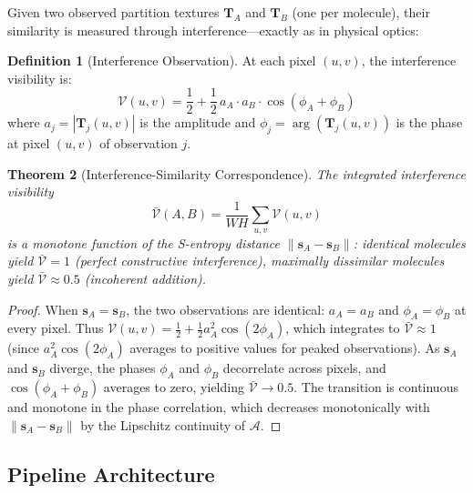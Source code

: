 \documentclass[11pt,twocolumn,a4paper]{article}
\newtheorem{theorem}{Theorem}[section]
\theoremstyle{definition}
\newtheorem{definition}[theorem]{Definition}
\theoremstyle{remark}
\begin{document}
Given two observed partition textures $\mathbf{T}_A$ and $\mathbf{T}_B$ (one per molecule), their similarity is measured through interference---exactly as in physical optics:

\begin{definition}[Interference Observation]
\label{def:interference}
At each pixel $(u,v)$, the interference visibility is:
\begin{equation}
\mathcal{V}(u,v) = \frac{1}{2} + \frac{1}{2}\, a_A \cdot a_B \cdot \cos(\phi_A + \phi_B)
\label{eq:visibility}
\end{equation}
where $a_j = |\mathbf{T}_j(u,v)|$ is the amplitude and $\phi_j = \arg(\mathbf{T}_j(u,v))$ is the phase at pixel $(u,v)$ of observation $j$.
\end{definition}

\begin{theorem}[Interference-Similarity Correspondence]
\label{thm:interference_similarity}
The integrated interference visibility
\begin{equation}
\bar{\mathcal{V}}(A, B) = \frac{1}{WH} \sum_{u,v} \mathcal{V}(u,v)
\label{eq:integrated_visibility}
\end{equation}
is a monotone function of the S-entropy distance $\|\mathbf{s}_A - \mathbf{s}_B\|$: identical molecules yield $\bar{\mathcal{V}} = 1$ (perfect constructive interference), maximally dissimilar molecules yield $\bar{\mathcal{V}} \approx 0.5$ (incoherent addition).
\end{theorem}

\begin{proof}
When $\mathbf{s}_A = \mathbf{s}_B$, the two observations are identical: $a_A = a_B$ and $\phi_A = \phi_B$ at every pixel. Thus $\mathcal{V}(u,v) = \tfrac{1}{2} + \tfrac{1}{2}a_A^2 \cos(2\phi_A)$, which integrates to $\bar{\mathcal{V}} \approx 1$ (since $a_A^2\cos(2\phi_A)$ averages to positive values for peaked observations). As $\mathbf{s}_A$ and $\mathbf{s}_B$ diverge, the phases $\phi_A$ and $\phi_B$ decorrelate across pixels, and $\cos(\phi_A + \phi_B)$ averages to zero, yielding $\bar{\mathcal{V}} \to 0.5$. The transition is continuous and monotone in the phase correlation, which decreases monotonically with $\|\mathbf{s}_A - \mathbf{s}_B\|$ by the Lipschitz continuity of $\mathcal{A}$.
\end{proof}

\subsection{Pipeline Architecture}
\end{document}
